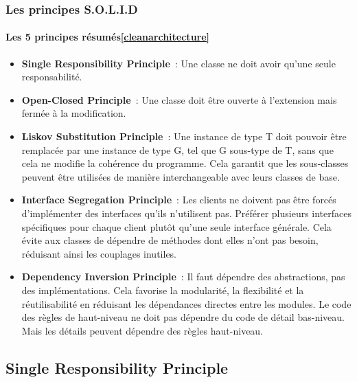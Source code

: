 \documentclass{beamer}
\begin{document}
    \begin{frame}
        \transdissolve
        \frametitle{Les principes S.O.L.I.D}
        \framesubtitle{Les 5 principes résumés\cref{cleanarchitecture}}
        \begin{footnotesize}
            \begin{itemize}
                \item \textbf{Single Responsibility Principle}~: Une classe ne doit avoir qu'une seule responsabilité.
                \item \textbf{Open-Closed Principle}~: Une classe doit être ouverte à l'extension mais fermée à la modification.
                \item \textbf{Liskov Substitution Principle}~: Une instance de type T doit pouvoir être remplacée par une instance de type G, tel que G sous-type de T, sans que cela ne modifie la cohérence du programme.
                Cela garantit que les sous-classes peuvent être utilisées de manière interchangeable avec leurs classes de base.
                \item \textbf{Interface Segregation Principle}~: Les clients ne doivent pas être forcés d'implémenter des interfaces qu'ils n'utilisent pas.
                Préférer plusieurs interfaces spécifiques pour chaque client plutôt qu'une seule interface générale.
                Cela évite aux classes de dépendre de méthodes dont elles n'ont pas besoin, réduisant ainsi les couplages inutiles.
                \item \textbf{Dependency Inversion Principle}~: Il faut dépendre des abstractions, pas des implémentations.
                Cela favorise la modularité, la flexibilité et la réutilisabilité en réduisant les dépendances directes entre les modules.
                Le code des règles de haut-niveau ne doit pas dépendre du code de détail bas-niveau.
                Mais les détails peuvent dépendre des règles haut-niveau.
            \end{itemize}
        \end{footnotesize}
    \end{frame}

    \subsection{Single Responsibility Principle}\label{subsec:mid-level-s}
\end{document}
